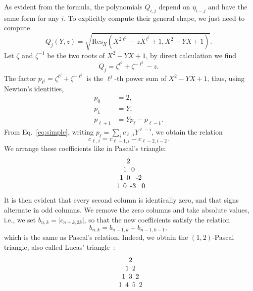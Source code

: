 \documentclass{sig-alternate}
\begin{document}
As evident from the formula, the polynomials $Q_{i,j}$ depend on
$\eta_{i-j}$ and have the same form for any $i$. To explicitly compute
their general shape, we just need to compute
\begin{equation}
  Q_j(Y, z) = \sqrt{\mathrm{Res}_X(X^{2\ell^j}-zX^{\ell^j}+1, X^2-YX+1)}.
\end{equation}
Let $\zeta$ and $\zeta^{-1}$ be the two roots of $X^2-YX+1$, by direct
calculation we find
\begin{equation}
  \label{eq:1}
  Q_j = \zeta^{\ell^j} + \zeta^{-\ell^j} - z.
\end{equation}
The factor $p_{\ell^j}=\zeta^{\ell^j} + \zeta^{-\ell^j}$ is the $\ell^j$-th power sum
of $X^2-YX+1$, thus, using Newton's identities,
\begin{align}
  p_0 &= 2,\\
  p_1 &= Y,\\
  \label{eq:simple}
  p_{\ell+1} &= Yp_{\ell} - p_{\ell-1}.
\end{align}
From Eq.~\eqref{eq:simple}, writing $p_\ell = \sum_i
c_{\ell,i}Y^{\ell-i}$, we obtain the relation
\begin{equation}
  c_{\ell,i} = c_{\ell-1,i} - c_{\ell-2,i-2}.
\end{equation}
We arrange these coefficients like in Pascal's triangle:
\begin{equation}
  \begin{tabular}{*{8}{c@{}}}
    &&&2\\
    &&1&&0\\
    &1&&0&&-2\\
    1&&0&&-3&&0
  \end{tabular}
\end{equation}
It is then evident that every second column is identically zero, and
that signs alternate in odd columns. We remove the zero columns and
take absolute values, i.e., we set $b_{n,k}=\lvert c_{n+k,2k}\rvert$, so
that the new coefficients satisfy the relation
\begin{equation}
  b_{n,k} = b_{n-1,k} + b_{n-1,k-1},
\end{equation}
which is the same as Pascal's relation. Indeed, we obtain the
$(1,2)$-Pascal triangle, also called Lucas' triangle~\cite{benjamin10}:
\begin{equation}
  \begin{tabular}{*{8}{c@{}}}
    &&&2\\
    &&1&&2\\
    &1&&3&&2\\
    1&&4&&5&&2
  \end{tabular}
\end{equation}
\end{document}
